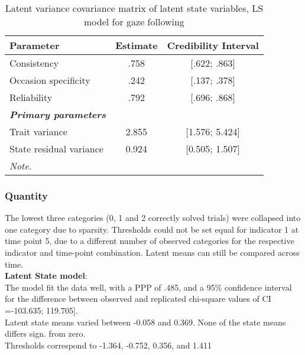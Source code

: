\begin{table}[H]
 \setlength{\tabcolsep}{1mm}
 \begin{center}
        \caption[Correlation latent State gaze]{Latent variance covariance matrix of latent state variables, LS model for gaze following}
        \label{Tab: correlations LS gaze}
            {\footnotesize
            \begin{tabular}{lcc}
            \hline     
          Parameter & Estimate & Credibility Interval\\
         \hline 
           Consistency & .758 &[.622; .863] \\
           Occasion specificity & .242&[.137; .378] \\
           Reliability &.792& [.696; .868] \\
            \textbf{\textit{Primary parameters}} & & \\
            Trait variance & 2.855& [1.576; 5.424] \\
             State residual variance & 0.924 & [0.505; 1.507] \\
 \hline 
\multicolumn{3}{p{0.4\textwidth}}{\scriptsize{\textit{Note.}}} \\
            \end{tabular}}
        \end{center}
        \end{table}


\subsubsection{Quantity}

 The lowest three categories (0, 1 and 2 correctly solved trials) were collapsed into one category due to sparsity. 
Thresholds could not be set equal for indicator 1 at time point 5, due to a different number of observed categories for the respective indicator and time-point combination. Latent means can still be compared across time. \\

\textbf{Latent State model}: \\
The model fit the data well, with a PPP of .485, and a 95\% confidence interval for the difference between observed and replicated chi-square values of CI =-103.635; 119.705]. \\
Latent state means varied between -0.058  and 0.369. None of the state means differs sign. from zero. \\
Thresholds correspond to -1.364, -0.752, 0.356, and 1.411 \\

